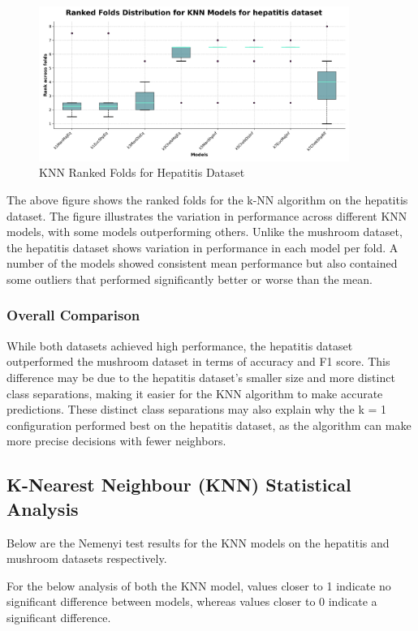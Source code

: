 \begin{figure}
    \centering
    \includegraphics[width=0.9\textwidth]{figures/ranked_folds_KNN_hepatitis.png}
    \caption{KNN Ranked Folds for Hepatitis Dataset}
    \label{fig:ranked_folds_KNN_hepatitis}
\end{figure}

The above figure shows the ranked folds for the k-NN algorithm on the hepatitis dataset.
The figure illustrates the variation in performance across different KNN models, with some models outperforming others.
Unlike the mushroom dataset, the hepatitis dataset shows variation in performance in each model per fold.
A number of the models showed consistent mean performance but also contained some outliers that performed significantly better or worse
than the mean.


\subsubsection{Overall Comparison}
While both datasets achieved high performance, the hepatitis dataset outperformed the mushroom dataset in terms of accuracy and F1 score.
This difference may be due to the hepatitis dataset's smaller size and more distinct class separations,
making it easier for the KNN algorithm to make accurate predictions. These distinct class separations may also explain why the k = 1 configuration
performed best on the hepatitis dataset, as the algorithm can make more precise decisions with fewer neighbors.

\subsection*{K-Nearest Neighbour (KNN) Statistical Analysis}
Below are the Nemenyi test results for the KNN models on the hepatitis and mushroom datasets respectively.

For the below analysis of both the KNN model, values closer to 1 indicate no significant difference between models,
whereas values closer to 0 indicate a significant difference.

